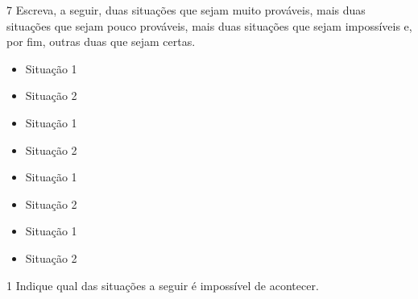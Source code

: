 \num{7} Escreva, a seguir, duas situações que sejam muito prováveis, mais duas
situações que sejam pouco prováveis, mais duas situações que sejam
impossíveis e, por fim, outras duas que sejam certas.




\begin{itemize}
\item Situação 1
\end{itemize}

\begin{itemize}
\item Situação 2
\end{itemize}


\begin{itemize}
\item Situação 1
\end{itemize}

\begin{itemize}
\item Situação 2
\end{itemize}


\begin{itemize}
\item Situação 1
\end{itemize}

\begin{itemize}
\item Situação 2
\end{itemize}


\begin{itemize}
\item Situação 1
\end{itemize}

\begin{itemize}
\item Situação 2
\end{itemize}

\pagebreak
{}

\num{1} Indique qual das situações a seguir é impossível de acontecer.

